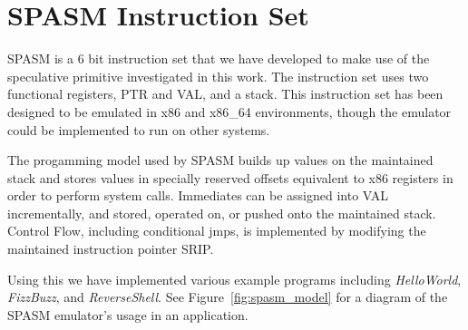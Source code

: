 \pagebreak
\section{SPASM Instruction Set}
\label{appendix:spasm}
\renewcommand{\thefootnote}{\fnsymbol{footnote}}

SPASM is a 6 bit instruction set that we have developed to make use of the 
speculative primitive investigated in this work. The instruction set uses two 
functional registers, PTR and VAL, and a stack. This instruction set has been 
designed to be emulated in x86 and x86\_64 environments, though the emulator 
could be implemented to run on other systems. 

The progamming model used by SPASM builds up values on the maintained stack
and stores values in specially reserved offsets equivalent to x86 registers 
in order to perform system calls. Immediates can be assigned into VAL
incrementally, and stored, operated on, or pushed onto the maintained
stack. Control Flow, including conditional jmps, is implemented by modifying 
the maintained instruction pointer SRIP. 

Using this we have implemented various example programs including 
\textit{HelloWorld}, \textit{FizzBuzz}, and \textit{ReverseShell}.
See Figure~\ref{fig:spasm_model} for a diagram of the SPASM emulator's
usage in an \speculake application.


